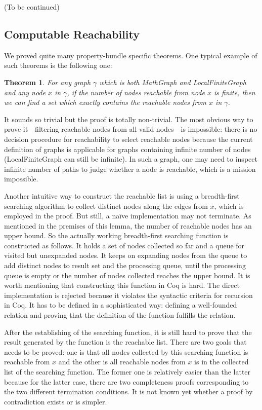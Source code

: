(To be continued)

\subsection{Computable Reachability}
We proved quite many property-bundle specific theorems. One typical
example of such theorems is the following one:
\newtheorem{mythm}{Theorem}
\begin{mythm}
For any graph $\gamma$ which is both MathGraph and LocalFiniteGraph
and any node $x$ in $\gamma$, if the number of nodes reachable from
node $x$ is finite, then we can find a set which exactly contains the
reachable nodes from $x$ in $\gamma$.
\end{mythm}
It sounds so trivial but the proof is totally non-trivial. The most
obvious way to prove it---filtering reachable nodes from all valid
nodes---is impossible: there is no decision procedure for reachability
to select reachable nodes because the current definition of graphs is
applicable for graphs containing infinite number of nodes
(LocalFiniteGraph can still be infinite). In such a graph, one may
need to inspect infinite number of paths to judge whether a node is
reachable, which is a mission impossible.

Another intuitive way to construct the reachable list is using a
breadth-first searching algorithm to collect distinct nodes along the
edges from $x$, which is employed in the proof. But still, a na\"ive
implementation may not terminate. As mentioned in the premises of this
lemma, the number of reachable nodes has an upper bound. So the
actually working breadth-first searching function is constructed as
follows. It holds a set of nodes collected so far and a queue for
visited but unexpanded nodes. It keeps on expanding nodes from the
queue to add distinct nodes to result set and the processing queue,
until the processing queue is empty or the number of nodes collected
reaches the upper bound. It is worth mentioning that constructing this
function in Coq is hard. The direct implementation is rejected because
it violates the syntactic criteria for recursion in Coq. It has to be
defined in a sophisticated way: defining a well-founded relation and
proving that the definition of the function fulfills the relation.

After the establishing of the searching function, it is still hard to
prove that the result generated by the function is the reachable
list. There are two goals that needs to be proved: one is that all
nodes collected by this searching function is reachable from $x$ and
the other is all reachable nodes from $x$ is in the
collected list of the searching function. The former one is relatively
easier than the latter because for the latter case, there are two
completeness proofs corresponding to the two different termination
conditions. It is not known yet whether a proof by contradiction
exists or is simpler.

